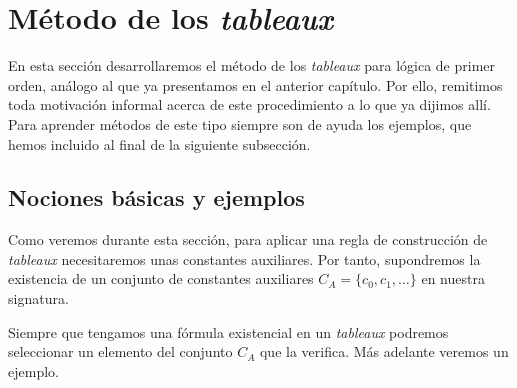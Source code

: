 \section{Método de los \textit{tableaux}}

En esta sección desarrollaremos el método de los \textit{tableaux} para lógica de primer orden, análogo al que ya presentamos en el anterior capítulo. Por ello, remitimos toda motivación informal acerca de este procedimiento a lo que ya dijimos allí. Para aprender métodos de este tipo siempre son de ayuda los ejemplos, que hemos incluido al final de la siguiente subsección.

\subsection{Nociones básicas y ejemplos}

Como veremos durante esta sección, para aplicar una regla de construcción de \textit{tableaux} necesitaremos unas constantes auxiliares. Por tanto, supondremos la existencia de un conjunto de constantes auxiliares $C_{A} = \{c_0,c_1, \dots \}$ en nuestra signatura.

Siempre que tengamos una fórmula existencial en un \textit{tableaux} podremos seleccionar un elemento del conjunto $C_A$ que la verifica. Más adelante veremos un ejemplo. 


